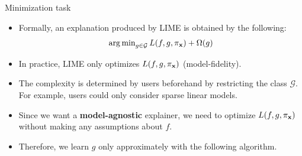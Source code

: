 \documentclass[11pt,compress,t,notes=noshow, xcolor=table]{beamer}
\newcommand{\Gspace}{\mathcal{G}}
\newcommand{\neigh}{\pi_{\xv}}
\begin{document}
\begin{vbframe}{Minimization task}
	\begin{itemize}
		\item Formally, an explanation produced by LIME is obtained by the following: 
		$$ \argmin_{g \in \Gspace} L(f, g, \neigh) + \Omega(g)$$
		\item In practice, LIME only optimizes $L(f, g, \neigh)$ (model-fidelity). 	
		\item The complexity is determined by users beforehand by restricting the class $\Gspace$. For example, users could only consider sparse linear models. 
		\item Since we want a \textbf{model-agnostic} explainer, we need to optimize $L(f, g, \neigh)$ without making any assumptions about $f$. 
		\item Therefore, we learn $g$ only approximately with the following algorithm.  
		\end{itemize}
\end{vbframe} 
\end{document}
